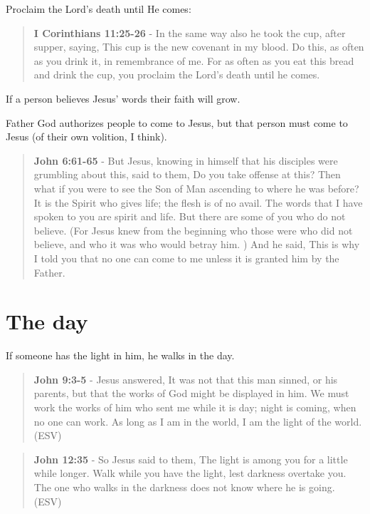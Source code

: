 \documentclass[11pt]{article}
\begin{document}
Proclaim the Lord's death until He comes:

\begin{quote}
\textbf{I Corinthians 11:25-26} - In the same way also he took the cup, after supper, saying, This cup is the new covenant in my blood. Do this, as often as you drink it, in remembrance of me. For as often as you eat this bread and drink the cup, you proclaim the Lord's death until he comes.
\end{quote}

If a person believes Jesus' words their faith will grow.

Father God authorizes people to come to Jesus, but that person must come to Jesus (of their own volition, I think).

\begin{quote}
\textbf{John 6:61-65} - But Jesus, knowing in himself that his disciples were grumbling about this, said to them, Do you take offense at this?  Then what if you were to see the Son of Man ascending to where he was before?  It is the Spirit who gives life; the flesh is of no avail. The words that I have spoken to you are spirit and life.  But there are some of you who do not believe. (For Jesus knew from the beginning who those were who did not believe, and who it was who would betray him. ) And he said, This is why I told you that no one can come to me unless it is granted him by the Father.
\end{quote}

\section{The day}
\label{sec:org907242d}
If someone has the light in him, he walks in the day.

\begin{quote}
\textbf{John 9:3-5} - Jesus answered, It was not that this man sinned, or his parents, but that the works of God might be displayed in him. We must work the works of him who sent me while it is day; night is coming, when no one can work. As long as I am in the world, I am the light of the world. (ESV)
\end{quote}

\begin{quote}
\textbf{John 12:35} - So Jesus said to them, The light is among you for a little while longer.  Walk while you have the light, lest darkness overtake you.  The one who walks in the darkness does not know where he is going.  (ESV)
\end{quote}
\end{document}

